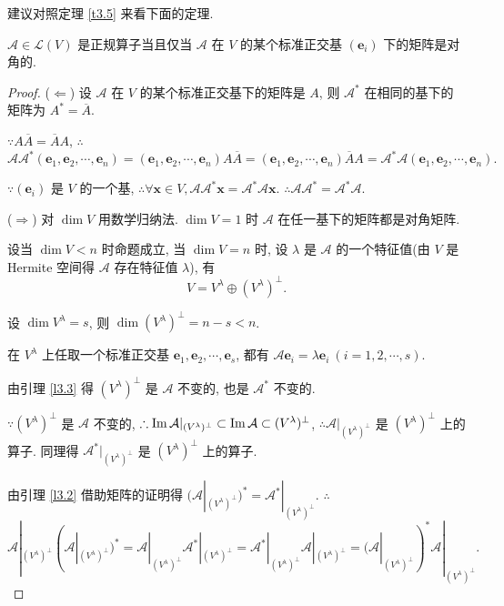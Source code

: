 \documentclass[color=black,device=normal,lang=cn,mode=geye]{elegantnote}
\begin{document}
建议对照定理 \ref{t3.5} 来看下面的定理.
\begin{theorem}[书上的定理 11]\label{t3.7}
    $\mathcal{A}\in\mathcal{L}(V)$ 是正规算子当且仅当 $\mathcal{A}$ 在 $V$ 的某个标准正交基 $(\boldsymbol{e}_i)$ 下的矩阵是对角的.
\end{theorem}
\begin{proof}
    ($\Leftarrow$) 设 $\mathcal{A}$ 在 $V$ 的某个标准正交基下的矩阵是 $A$, 则 $\mathcal{A}^*$ 在相同的基下的矩阵为 $A^*=\overline{A}$.
    
    $\because A\overline{A}=\overline{A}A$, $\therefore$
    \[\mathcal{A}\mathcal{A}^*(\boldsymbol{e}_1,\boldsymbol{e}_2,\cdots,\boldsymbol{e}_n)=(\boldsymbol{e}_1,\boldsymbol{e}_2,\cdots,\boldsymbol{e}_n)A\overline{A}=(\boldsymbol{e}_1,\boldsymbol{e}_2,\cdots,\boldsymbol{e}_n)\overline{A}A=\mathcal{A}^*\mathcal{A}(\boldsymbol{e}_1,\boldsymbol{e}_2,\cdots,\boldsymbol{e}_n).\]

    $\because(\boldsymbol{e}_i)$ 是 $V$ 的一个基, $\therefore\forall\boldsymbol{x}\in V,\mathcal{A}\mathcal{A}^*\boldsymbol{x}=\mathcal{A}^*\mathcal{A}\boldsymbol{x}$. $\therefore\mathcal{A}\mathcal{A}^*=\mathcal{A}^*\mathcal{A}$.

    ($\Rightarrow$) 对 $\dim V$ 用数学归纳法. $\dim V=1$ 时 $\mathcal{A}$ 在任一基下的矩阵都是对角矩阵.

    设当 $\dim V<n$ 时命题成立, 当 $\dim V=n$ 时, 设 $\lambda$ 是 $\mathcal{A}$ 的一个特征值(由 $V$ 是 Hermite 空间得 $\mathcal{A}$ 存在特征值 $\lambda$), 有
    \[V=V^\lambda\oplus(V^\lambda)^\perp.\]

    设 $\dim V^\lambda=s$, 则 $\dim(V^\lambda)^\perp=n-s<n$.

    在 $V^\lambda$ 上任取一个标准正交基 $\boldsymbol{e}_1,\boldsymbol{e}_2,\cdots,\boldsymbol{e}_s$, 都有 $\mathcal{A}\boldsymbol{e}_i=\lambda\boldsymbol{e}_i\ (i=1,2,\cdots,s)$.

    由引理 \ref{l3.3} 得 $(V^\lambda)^\perp$ 是 $\mathcal{A}$ 不变的, 也是 $\mathcal{A}^*$ 不变的.

    $\because(V^\lambda)^\perp$ 是 $\mathcal{A}$ 不变的, $\therefore\operatorname{Im} \mathcal{A}|_{(V^\lambda)^\perp}\subset\operatorname{Im} \mathcal{A}\subset(V^\lambda)^\perp$, $\therefore\mathcal{A}|_{(V^\lambda)^\perp}$ 是 $(V^\lambda)^\perp$ 上的算子. 同理得 $\mathcal{A}^*|_{(V^\lambda)^\perp}$ 是 $(V^\lambda)^\perp$ 上的算子.

    由引理 \ref{l3.2} 借助矩阵的证明得 $(\mathcal{A}|_{(V^\lambda)^\perp})^*=\mathcal{A}^*|_{(V^\lambda)^\perp}$. $\therefore$
    \[\mathcal{A}|_{(V^\lambda)^\perp}(\mathcal{A}|_{(V^\lambda)^\perp})^*=\mathcal{A}|_{(V^\lambda)^\perp}\mathcal{A}^*|_{(V^\lambda)^\perp}=\mathcal{A}^*|_{(V^\lambda)^\perp}\mathcal{A}|_{(V^\lambda)^\perp}=(\mathcal{A}|_{(V^\lambda)^\perp})^*\mathcal{A}|_{(V^\lambda)^\perp}.\]


\end{proof}
\end{document}
